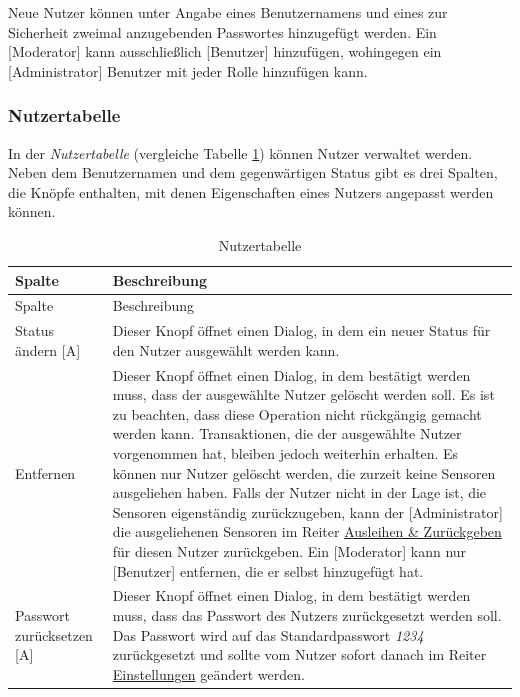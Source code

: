 \documentclass[
]{article}
\begin{document}
Neue Nutzer können unter Angabe eines Benutzernamens und eines zur Sicherheit zweimal anzugebenden Passwortes hinzugefügt werden. Ein {[}Moderator{]} kann ausschließlich {[}Benutzer{]} hinzufügen, wohingegen ein {[}Administrator{]} Benutzer mit jeder Rolle hinzufügen kann.

\hypertarget{nutzertabelle}{%
\subsubsection{Nutzertabelle}\label{nutzertabelle}}

In der \emph{Nutzertabelle} (vergleiche Tabelle \ref{tab:user-table}) können Nutzer verwaltet werden. Neben dem Benutzernamen und dem gegenwärtigen Status gibt es drei Spalten, die Knöpfe enthalten, mit denen Eigenschaften eines Nutzers angepasst werden können.

\begin{longtable}[]{@{}
  >{\raggedright\arraybackslash}p{}
  >{\raggedright\arraybackslash}p{}@{}}
\caption{\label{tab:user-table} Nutzertabelle}\tabularnewline
\toprule
Spalte & Beschreibung \\
\midrule
\endfirsthead
\toprule
Spalte & Beschreibung \\
\midrule
\endhead
Status ändern {[}A{]} & Dieser Knopf öffnet einen Dialog, in dem ein neuer Status für den Nutzer ausgewählt werden kann. \\
Entfernen & Dieser Knopf öffnet einen Dialog, in dem bestätigt werden muss, dass der ausgewählte Nutzer gelöscht werden soll. Es ist zu beachten, dass diese Operation nicht rückgängig gemacht werden kann. Transaktionen, die der ausgewählte Nutzer vorgenommen hat, bleiben jedoch weiterhin erhalten. Es können nur Nutzer gelöscht werden, die zurzeit keine Sensoren ausgeliehen haben. Falls der Nutzer nicht in der Lage ist, die Sensoren eigenständig zurückzugeben, kann der {[}Administrator{]} die ausgeliehenen Sensoren im Reiter \protect\hyperlink{operate}{Ausleihen \& Zurückgeben} für diesen Nutzer zurückgeben. Ein {[}Moderator{]} kann nur {[}Benutzer{]} entfernen, die er selbst hinzugefügt hat. \\
Passwort zurücksetzen {[}A{]} & Dieser Knopf öffnet einen Dialog, in dem bestätigt werden muss, dass das Passwort des Nutzers zurückgesetzt werden soll. Das Passwort wird auf das Standardpasswort \emph{1234} zurückgesetzt und sollte vom Nutzer sofort danach im Reiter \protect\hyperlink{settings}{Einstellungen} geändert werden. \\
\bottomrule
\end{longtable}
\end{document}
